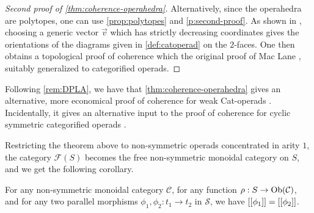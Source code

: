 \begin{proof}[Second proof of {\cref{thm:coherence-operahedra}}]
    Alternatively, since the operahedra are polytopes, one can use \cref{prop:polytopes} and \cref{p:second-proof}. 
    As shown in \cite[Prop.~3.11]{laplante-anfossiDiagonalOperahedra2022a}, choosing a generic vector $\vec v$ which has strictly decreasing coordinates gives the orientations of the diagrams given in \cref{def:catoperad} on the $2$-faces.
    One then obtains a topological proof of coherence which  the original proof of Mac Lane \cite[Thm.~3.1]{MacLane63}, suitably generalized to categorified operads. 
\end{proof}
   
Following \cref{rem:DPLA}, we have that \cref{thm:coherence-operahedra} gives an alternative, more economical proof of coherence for weak Cat-operads \cite[Prop.~14.2]{DP15}.
Incidentally, it gives an alternative input to the proof of coherence for cyclic symmetric categorified operads \cite{curienCategorifiedCyclicOperads2020}.

Restricting the theorem above to non-symmetric operads concentrated in arity $1$, the category $\mathcal{F}(S)$ becomes the free non-symmetric monoidal category on $S$, and we get the following corollary. 

\begin{corollary}
\label{cor:MacLane}
    For any non-symmetric monoidal category $\mathcal{C}$, for any function $\rho : S \to \mathrm{Ob}(\mathcal{C})$, and for any two parallel morphisms $\phi_1,\phi_2: t_1 \to t_2$ in $\mathcal{S}$, we have $[[\phi_1]]=[[\phi_2]]$.
\end{corollary}

\begin{rem}
\end{rem}




